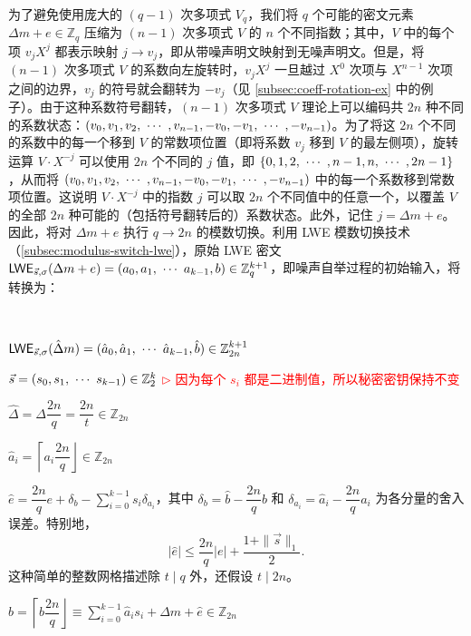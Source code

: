 为了避免使用庞大的 $(q-1)$ 次多项式 $V_q$，我们将 $q$ 个可能的密文元素 $\Delta m + e \in \mathbb{Z}_q$ 压缩为 $(n-1)$ 次多项式 $V$ 的 $n$ 个不同指数；其中，$V$ 中的每个项 $v_jX^j$ 都表示映射 $j \rightarrow v_j$，即从带噪声明文映射到无噪声明文。但是，将 $(n-1)$ 次多项式 $V$ 的系数向左旋转时，$v_jX^j$ 一旦越过 $X^0$ 次项与 $X^{n-1}$ 次项之间的边界，$v_j$ 的符号就会翻转为 $-v_j$（见 \autoref{subsec:coeff-rotation-ex} 中的例子）。由于这种系数符号翻转，$(n-1)$ 次多项式 $V$ 理论上可以编码共 $2n$ 种不同的系数状态：$(v_0, v_1, v_2, \text{ } \text{$\cdots$} \text{ }, v_{n-1}, -v_0, -v_1, \text{ } \text{$\cdots$} \text{ }, -v_{n-1})$。为了将这 $2n$ 个不同的系数中的每一个移到 $V$ 的常数项位置（即将系数 $v_j$ 移到 $V$ 的最左侧项），旋转运算 $V \cdot X^{-j}$ 可以使用 $2n$ 个不同的 $j$ 值，即 $\{0, 1, 2, \text{ } \text{$\cdots$} \text{ }, n-1, n, \text{ } \text{$\cdots$} \text{ }, 2n-1\}$，从而将 $(v_0, v_1, v_2, \text{ } \text{$\cdots$} \text{ }, v_{n-1}, -v_0, -v_1, \text{ } \text{$\cdots$} \text{ }, -v_{n-1})$ 中的每一个系数移到常数项位置。这说明 $V\cdot X^{-j}$ 中的指数 $j$ 可以取 $2n$ 个不同值中的任意一个，以覆盖 $V$ 的全部 $2n$ 种可能的（包括符号翻转后的）系数状态。此外，记住 $j = \Delta m + e$。因此，将对 $\Delta m + e$ 执行 $q \rightarrow 2n$ 的模数切换。利用 LWE 模数切换技术（\autoref{subsec:modulus-switch-lwe}），原始 LWE 密文 $\textsf{LWE}_{\vec{s}, \sigma}(\Delta m + e) = ({a}_0, {a}_1, \text{ } \text{$\cdots$} \text{ } {a}_{k-1}, {b}) \in \mathbb{Z}_q^{k+1}$，即噪声自举过程的初始输入，将转换为：

$ $

$\textsf{LWE}_{\vec{s}, \sigma}(\hat{\Delta} m) = (\hat{a}_0, \hat{a}_1, \text{ } \text{$\cdots$} \text{ } \hat{a}_{k-1}, \hat{b}) \in \mathbb{Z}_{2n}^{k+1}$

$\vec{s} = (s_0, s_1, \text{ } \text{$\cdots$} \text{ } s_{k-1}) \in \mathbb{Z}_2^{k}$  \textcolor{red}{ $\rhd$ 因为每个 $s_i$ 都是二进制值，所以秘密密钥保持不变}

$\hat{\Delta} = \Delta\dfrac{2n}{q} = \dfrac{2n}{t} \in \mathbb{Z}_{2n}$

$\hat{a}_i = \left \lceil a_i\dfrac{2n}{q} \right \rfloor \in \mathbb{Z}_{2n}$

$\hat e=\dfrac{2n}{q}e+\delta_b-\sum_{i=0}^{k-1}s_i\delta_{a_i}$，其中 $\delta_b=\hat b-\dfrac{2n}{q}b$ 和 $\delta_{a_i}=\hat a_i-\dfrac{2n}{q}a_i$ 为各分量的舍入误差。特别地，
\[
|\hat e|\leq\dfrac{2n}{q}|e|+\dfrac{1+\|\vec s\|_1}{2}.
\]
这种简单的整数网格描述除 $t\mid q$ 外，还假设 $t\mid 2n$。

$\hat{b} = \left \lceil b\dfrac{2n}{q} \right \rfloor \equiv \sum\limits_{i=0}^{k-1} \hat{a}_is_i + \hat{\Delta} m + \hat{e}  \in \mathbb{Z}_{2n}$



